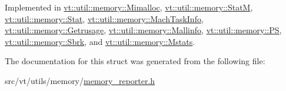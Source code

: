 Implemented in \hyperlink{structvt_1_1util_1_1memory_1_1_mimalloc_ab404700265f120eedb4cf06e4ae0b602}{vt\+::util\+::memory\+::\+Mimalloc}, \hyperlink{structvt_1_1util_1_1memory_1_1_stat_m_a066c740a52e05e7184dfff530ed07173}{vt\+::util\+::memory\+::\+StatM}, \hyperlink{structvt_1_1util_1_1memory_1_1_stat_aa14297e6605a523e4164597d45fba06f}{vt\+::util\+::memory\+::\+Stat}, \hyperlink{structvt_1_1util_1_1memory_1_1_mach_task_info_a8d610d4ca50ad62ef2dc623713a67b7d}{vt\+::util\+::memory\+::\+Mach\+Task\+Info}, \hyperlink{structvt_1_1util_1_1memory_1_1_getrusage_a976a842feb631dfb19c2f4ecda2398ab}{vt\+::util\+::memory\+::\+Getrusage}, \hyperlink{structvt_1_1util_1_1memory_1_1_mallinfo_a872e568b6266e301844dbc252886794f}{vt\+::util\+::memory\+::\+Mallinfo}, \hyperlink{structvt_1_1util_1_1memory_1_1_p_s_a8637d08841cd23f361e83be9cc15e2b4}{vt\+::util\+::memory\+::\+PS}, \hyperlink{structvt_1_1util_1_1memory_1_1_sbrk_af4df47e41f60e7f2da7a6b47c8b4a046}{vt\+::util\+::memory\+::\+Sbrk}, and \hyperlink{structvt_1_1util_1_1memory_1_1_mstats_aa3ba12317492d6f3c95f6b2bbb20f831}{vt\+::util\+::memory\+::\+Mstats}.



The documentation for this struct was generated from the following file\+:\begin{DoxyCompactItemize}
\item 
src/vt/utils/memory/\hyperlink{memory__reporter_8h}{memory\+\_\+reporter.\+h}\end{DoxyCompactItemize}
